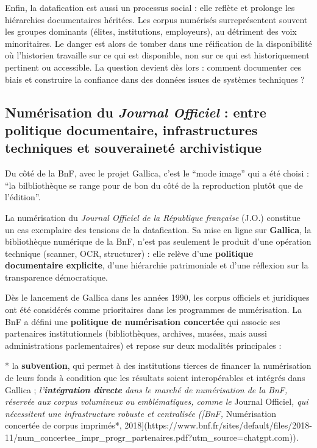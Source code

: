 Enfin, la datafication est aussi un processus social : elle reflète et prolonge les hiérarchies documentaires héritées. Les corpus numérisés surreprésentent souvent les groupes dominants (élites, institutions, employeurs), au détriment des voix minoritaires. Le danger est alors de tomber dans une réification de la disponibilité où l’historien travaille sur ce qui est disponible, non sur ce qui est historiquement pertinent ou accessible. La question devient dès lors : comment documenter ces biais et construire la confiance dans des données issues de systèmes techniques ? 

\subsection{Numérisation du \emph{Journal Officiel} : entre politique documentaire, infrastructures techniques et souveraineté archivistique}

Du côté de la BnF, avec le projet Gallica, c'est le \enquote{mode image} qui a été choisi : \enquote{la bilbliothèque se range pour de bon du côté de la reproduction plutôt que de l'édition}.

La numérisation du \emph{Journal Officiel de la République française} (J.O.) constitue un cas exemplaire des tensions de la datafication. Sa mise en ligne sur \textbf{Gallica}, la bibliothèque numérique de la BnF, n’est pas seulement le produit d’une opération technique (scanner, OCR, structurer) : elle relève d’une \textbf{politique documentaire explicite}, d’une hiérarchie patrimoniale et d’une réflexion sur la transparence démocratique.

Dès le lancement de Gallica dans les années 1990, les corpus officiels et juridiques ont été considérés comme prioritaires dans les programmes de numérisation. La BnF a défini une \textbf{politique de numérisation concertée} qui associe ses partenaires institutionnels (bibliothèques, archives, musées, mais aussi administrations parlementaires) et repose sur deux modalités principales :

* la \textbf{subvention}, qui permet à des institutions tierces de financer la numérisation de leurs fonds à condition que les résultats soient interopérables et intégrés dans Gallica ;
\emph{ l’\textbf{intégration directe} dans le marché de numérisation de la BnF, réservée aux corpus volumineux ou emblématiques, comme le }Journal Officiel\emph{, qui nécessitent une infrastructure robuste et centralisée ([BnF, }Numérisation concertée de corpus imprimés*, 2018](https://www.bnf.fr/sites/default/files/2018-11/num_concertee_impr_progr_partenaires.pdf?utm_source=chatgpt.com)).

